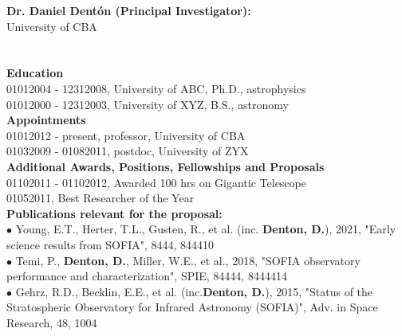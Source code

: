 %
\textbf{\color{Blue}\large Dr. Daniel Dent{\'o}n (Principal Investigator):}\\
University of CBA\\
\\ \\ \vspace{-1em}
\textbf{Education}\\
01012004 - 12312008, University of ABC, Ph.D., astrophysics\\
01012000 - 12312003, University of XYZ, B.S., astronomy\\
\textbf{Appointments}\\
01012012 - present, professor, University of CBA\\
01032009 - 01082011, postdoc, University of ZYX\\
\textbf{Additional Awards, Positions, Fellowships and Proposals}\\
01102011 - 01102012, Awarded 100 hrs on Gigantic Telescope\\
01052011, Best Researcher of the Year\\
\textbf{Publications relevant for the proposal:}\\
{\scriptsize{$\bullet$}} Young, E.T., Herter, T.L., Gusten, R., et al. (inc. \textbf{Denton, D.}), 2021, "Early science results from SOFIA", 8444, 844410\\
{\scriptsize{$\bullet$}} Temi, P., \textbf{Denton, D.}, Miller, W.E., et al., 2018, "SOFIA observatory performance and characterization", SPIE, 84444, 8444414\\
{\scriptsize{$\bullet$}} Gehrz, R.D., Becklin, E.E., et al. (inc.\textbf{Denton, D.}), 2015, "Status of the Stratospheric Observatory for Infrared Astronomy (SOFIA)", Adv. in Space Research, 48, 1004\\
